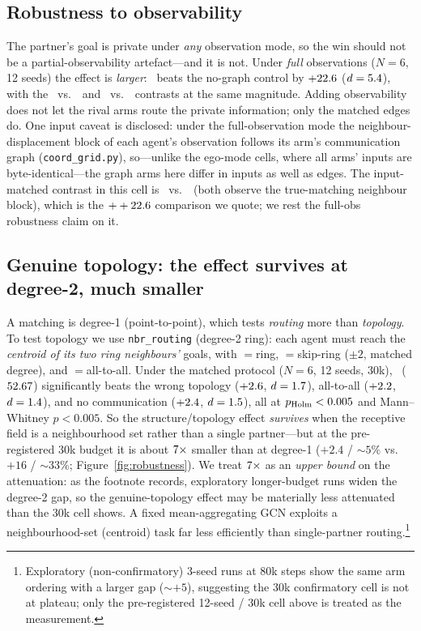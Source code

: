 \subsection{Robustness to observability}
\label{sec:structure:obs}

The partner's goal is private under \emph{any} observation mode, so the win
should not be a partial-observability artefact---and it is not. Under
\emph{full} observations ($N{=}6$, 12 seeds) the effect is \emph{larger}:
\gtrue\ beats the no-graph control by $+22.6$ ($d=5.4$), with the
\gtrue\ vs.\ \gwrong\ and \gtrue\ vs.\ \gcomplete\ contrasts at the same
magnitude. Adding observability does not let the rival arms route the private
information; only the matched edges do. One input caveat is disclosed: under
the full-observation mode the neighbour-displacement block of each agent's
observation follows its arm's communication graph
(\texttt{coord\_grid.py}), so---unlike the ego-mode cells, where all arms'
inputs are byte-identical---the graph arms here differ in inputs as well as
edges. The input-matched contrast in this cell is \gtrue\ vs.\ \mlpc\ (both
observe the true-matching neighbour block), which is the $++22.6$
comparison we quote; we rest the full-obs robustness claim on it.

\subsection{Genuine topology: the effect survives at degree-2, much smaller}
\label{sec:structure:degree2}

A matching is degree-1 (point-to-point), which tests \emph{routing} more than
\emph{topology}. To test topology we use \texttt{nbr\_routing} (degree-2
ring): each agent must reach the \emph{centroid of its two ring neighbours'}
goals, with \gtrue${}={}$ring, \gwrong${}={}$skip-ring ($\pm2$, matched
degree), and \gcomplete${}={}$all-to-all. Under the matched protocol
($N{=}6$, 12 seeds, 30k), \gtrue\ ($52.67$) significantly beats the
wrong topology ($+2.6$, $d=1.7$), all-to-all ($+2.2$,
$d=1.4$), and no communication ($+2.4$, $d=1.5$), all at
$p_{\text{Holm}}<0.005$ and Mann--Whitney $p<0.005$. So the
structure/topology effect \emph{survives} when the receptive field is a
neighbourhood set rather than a single partner---but at the pre-registered 30k
budget it is about $7\times$ smaller than at degree-1 ($+2.4$ /
${\sim}5\%$ vs.\ $+16$ / ${\sim}33\%$; Figure~\ref{fig:robustness}). We treat $7\times$ as an
\emph{upper bound} on the attenuation: as the footnote records, exploratory
longer-budget runs widen the degree-2 gap, so the genuine-topology effect may be
materially less attenuated than the 30k cell shows. A fixed mean-aggregating GCN
exploits a
neighbourhood-set (centroid) task far less efficiently than single-partner
routing.\footnote{Exploratory (non-confirmatory) 3-seed runs at 80k steps show
the same arm ordering with a larger gap (${\sim}+5$), suggesting the 30k
confirmatory cell is not at plateau; only the pre-registered 12-seed / 30k cell
above is treated as the measurement.}

